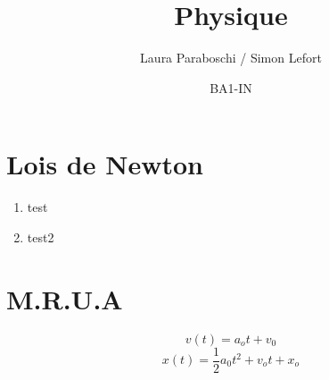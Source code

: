 \documentclass{article}
\title{Physique}
\author{Laura Paraboschi / Simon Lefort}
\date{BA1-IN}
\begin{document}
\maketitle

\section{Lois de Newton}

\begin{enumerate}
    \item test
    \item test2
\end{enumerate}


\section{M.R.U.A}

\[ v(t) = a_ot + v_0 \]
\[ x(t) = \frac{1}{2}a_0t^2 + v_ot + x_o \]
\end{document}
